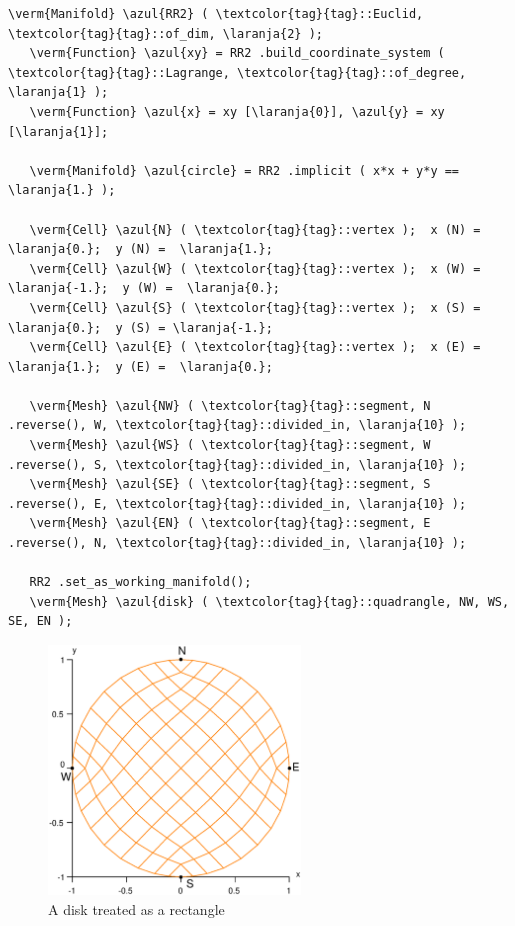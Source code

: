 \begin{Verbatim}[commandchars=\\\{\},formatcom=\small\tt,frame=single,
   label=parag-\ref{\numb section 2.\numb parag 9}.cpp,rulecolor=\color{moldura},
   baselinestretch=0.94,framesep=2mm                                             ]
   \verm{Manifold} \azul{RR2} ( \textcolor{tag}{tag}::Euclid, \textcolor{tag}{tag}::of_dim, \laranja{2} );
   \verm{Function} \azul{xy} = RR2 .build_coordinate_system ( \textcolor{tag}{tag}::Lagrange, \textcolor{tag}{tag}::of_degree, \laranja{1} );
   \verm{Function} \azul{x} = xy [\laranja{0}], \azul{y} = xy [\laranja{1}];
   
   \verm{Manifold} \azul{circle} = RR2 .implicit ( x*x + y*y == \laranja{1.} );
   
   \verm{Cell} \azul{N} ( \textcolor{tag}{tag}::vertex );  x (N) =  \laranja{0.};  y (N) =  \laranja{1.};
   \verm{Cell} \azul{W} ( \textcolor{tag}{tag}::vertex );  x (W) = \laranja{-1.};  y (W) =  \laranja{0.};
   \verm{Cell} \azul{S} ( \textcolor{tag}{tag}::vertex );  x (S) =  \laranja{0.};  y (S) = \laranja{-1.};
   \verm{Cell} \azul{E} ( \textcolor{tag}{tag}::vertex );  x (E) =  \laranja{1.};  y (E) =  \laranja{0.};

   \verm{Mesh} \azul{NW} ( \textcolor{tag}{tag}::segment, N .reverse(), W, \textcolor{tag}{tag}::divided_in, \laranja{10} );
   \verm{Mesh} \azul{WS} ( \textcolor{tag}{tag}::segment, W .reverse(), S, \textcolor{tag}{tag}::divided_in, \laranja{10} );
   \verm{Mesh} \azul{SE} ( \textcolor{tag}{tag}::segment, S .reverse(), E, \textcolor{tag}{tag}::divided_in, \laranja{10} );
   \verm{Mesh} \azul{EN} ( \textcolor{tag}{tag}::segment, E .reverse(), N, \textcolor{tag}{tag}::divided_in, \laranja{10} );
   
   RR2 .set_as_working_manifold();
   \verm{Mesh} \azul{disk} ( \textcolor{tag}{tag}::quadrangle, NW, WS, SE, EN );
\end{Verbatim}

\begin{figure}[ht] \centering
  \includegraphics[width=67mm]{disk}
  \caption{A disk treated as a rectangle}
  \label{\numb section 2.\numb fig 9}
\end{figure}

